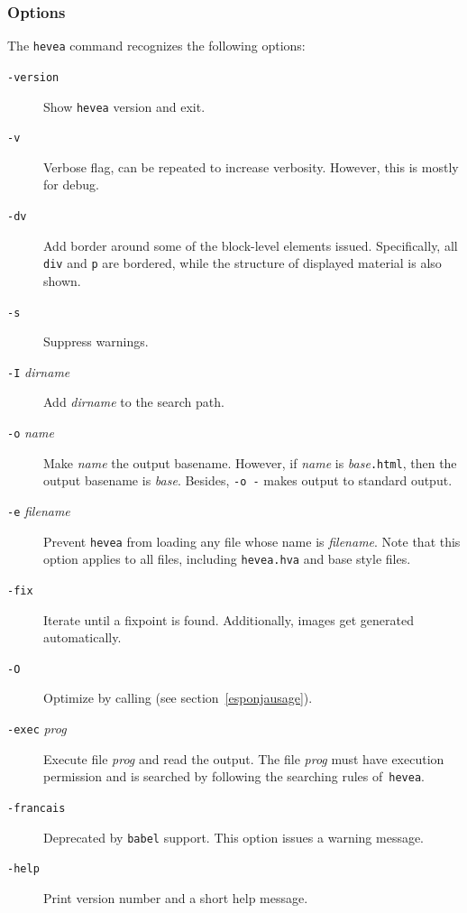 \subsubsection{\label{heveaoptions}Options}
The \texttt{hevea} command recognizes the following options:
\begin{description}
\item[{\tt -version}] Show \texttt{hevea} version and exit.
\item[{\tt -v}] Verbose flag, can be repeated to increase
verbosity. However, this is mostly for debug.
\item[{\tt -dv}] Add border around some of the block-level
elements issued. Specifically, all \verb+div+ and \verb+p+ are bordered,
while the structure of displayed material is also shown.
\item[{\tt -s}] Suppress warnings.
\item[{\tt -I} {\it dirname}] Add {\it dirname} to the search path.
\item[{\tt -o} {\it name}] Make \textit{name} the output basename.
However, if \textit{name} is \textit{base}\texttt{.html}, then
the output basename is \textit{base}.
Besides, {\tt -o -} makes \hevea{} output to standard output.
\item[{\tt -e} {\it filename}] Prevent \texttt{hevea} from loading any file
whose name is \textit{filename}. Note that this option applies to all
files, including \texttt{hevea.hva} and base style files.
\item[{\tt -fix}] Iterate \hevea{} until a fixpoint is found.
Additionally, images get generated automatically.
\item[{\tt -O}] Optimize \html{} by calling \esponja{} (see
section~\ref{esponjausage}).
\item[{\tt -exec} {\it prog}] Execute file \textit{prog} and read the
output. The file \textit{prog} must have execution permission and is
searched by following the searching rules of~\texttt{hevea}.
\item[{\tt -francais}] Deprecated by \texttt{babel} support. This
option issues a warning message.
\item[{\tt -help}] Print version number and a short help message.
\end{description}

